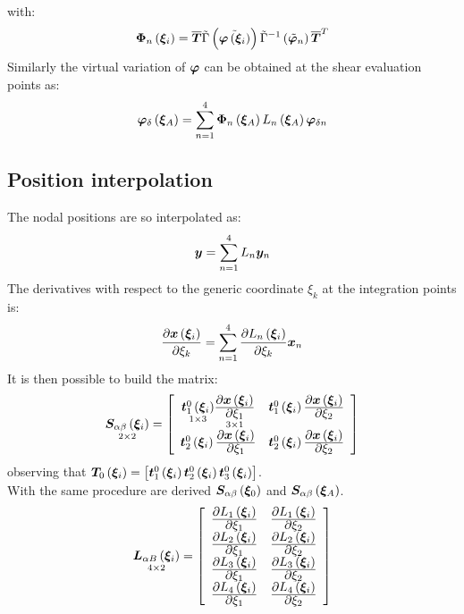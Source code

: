 with:
\begin{equation}
\T{ \Phi }_n \valxii =
\overline{ \T{ T } } \tilde{ \Gamma } \plbr{ \tilde{ \T{\varphi} \valxii } }  \tilde{ \Gamma } ^ {-1} \plbr{ \tilde{ \T{\varphi} }_n } \overline{ \T{ T } } ^ T
\end{equation}
Similarly the virtual variation of $\T{\varphi}$ can be obtained at the shear evaluation points as:
\begin{equation}
\T{ \varphi }_{\delta} \valxiA =
\sum_{ n = 1 }^{ 4 } \T{ \Phi }_n \valxiA L_n \valxiA \T{\varphi}_{\delta n}
\end{equation}
\subsection{Position interpolation}
The nodal positions are so interpolated as:
\begin{equation}
\T{ y }   = \sum_{ n = 1 }^4  L_n   \T{ y }_n
\end{equation}
The derivatives with respect to the generic coordinate $\xi_k$ at the integration points is:
\begin{equation}
\fracdp{ \T{ x } \valxii }{ \xi_k }  = \sum_{ n = 1 }^4 \fracdp{ L_n \valxii }{ \xi_k } \T{ x }_n
\end{equation}
It is then possible to build the matrix:
\begin{equation}
\underset{ 2 \times 2 }{ \T{ S }_{ \alpha \beta } \valxii } =
\sqbr{ \matr{ c  c  }{
\underset{ 1 \times 3 }{ \T{ t }_{1}^{0} \valxii } \underset{ 3 \times 1 }{ \fracdp{ \T{x} \valxii }{ \xi_1 } } & \T{ t }_{1}^{0} \valxii \fracdp{ \T{x} \valxii }{ \xi_2 } \\
\T{ t }_{2}^{0} \valxii \fracdp{ \T{x} \valxii }{ \xi_1 } & \T{ t }_{2}^{0} \valxii \fracdp{ \T{x} \valxii }{ \xi_2 }
}}
\end{equation}
observing that $\T{T}_0 \valxii = \sqbr{ \T{t}_{1}^{0} \valxii  \T{t}_{2}^{0} \valxii \T{t}_{3}^{0} \valxii }$.\\
With the same procedure are derived $\T{ S }_{ \alpha \beta } \valxio$ and  $\T{ S }_{ \alpha \beta } \valxiA$.\\
\begin{equation}
\underset{ 4 \times 2 } { \T{ L }_{ \alpha B } \valxii } =
\sqbr{ \matr{ c c }{
\fracdp{ L_1 \valxii }{ \xi_1 } & \fracdp{ L_1 \valxii }{ \xi_2 } \\
\fracdp{ L_2 \valxii }{ \xi_1 } & \fracdp{ L_2 \valxii }{ \xi_2 } \\
\fracdp{ L_3 \valxii }{ \xi_1 } & \fracdp{ L_3 \valxii }{ \xi_2 } \\
\fracdp{ L_4 \valxii }{ \xi_1 } & \fracdp{ L_4 \valxii }{ \xi_2 } \\
}}
\end{equation}
